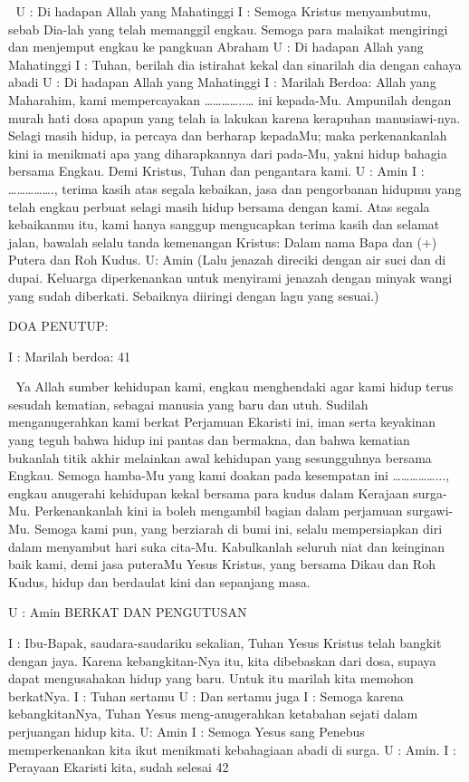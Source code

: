 \documentclass[10pt,a5paper,fancyhdr]{memoir}
\begin{document}

U : Di hadapan Allah yang Mahatinggi 
I : Semoga Kristus menyambutmu, sebab Dia-lah yang telah 
memanggil engkau. Semoga para malaikat mengiringi dan 
menjemput engkau ke pangkuan Abraham 
U : Di hadapan Allah yang Mahatinggi 
I : Tuhan, berilah dia istirahat kekal dan sinarilah dia dengan cahaya 
abadi 
U : Di hadapan Allah yang Mahatinggi 
I : Marilah Berdoa: 
Allah yang Maharahim, kami mempercayakan …………..… ini 
kepada-Mu. Ampunilah dengan murah hati dosa apapun yang telah ia 
lakukan karena kerapuhan manusiawi-nya. Selagi masih hidup, ia 
percaya dan berharap kepadaMu; maka perkenankanlah kini ia 
menikmati apa yang diharapkannya dari pada-Mu, yakni hidup 
bahagia bersama Engkau. Demi Kristus, Tuhan dan pengantara kami. 
U : Amin 
I : ……………., terima kasih atas segala kebaikan, jasa dan 
pengorbanan hidupmu yang telah engkau perbuat selagi masih hidup 
bersama dengan kami. Atas segala kebaikanmu itu, kami hanya 
sanggup mengucapkan terima kasih dan selamat jalan, bawalah selalu 
tanda kemenangan Kristus: Dalam nama Bapa dan (+) Putera dan 
Roh Kudus. 
U: Amin 
(Lalu jenazah direciki dengan air suci dan di dupai. Keluarga 
diperkenankan untuk menyirami jenazah dengan minyak wangi yang 
sudah diberkati. Sebaiknya diiringi dengan lagu yang sesuai.) 

DOA PENUTUP: 

I : Marilah berdoa: 
41 



Ya Allah sumber kehidupan kami, engkau menghendaki agar kami 
hidup terus sesudah kematian, sebagai manusia yang baru dan utuh. 
Sudilah menganugerahkan kami berkat Perjamuan Ekaristi ini, iman 
serta keyakinan yang teguh bahwa hidup ini pantas dan bermakna, 
dan bahwa kematian bukanlah titik akhir melainkan awal kehidupan 
yang sesungguhnya bersama Engkau. Semoga hamba-Mu yang kami 
doakan pada kesempatan ini ……………..., engkau anugerahi 
kehidupan kekal bersama para kudus dalam Kerajaan surga-Mu. 
Perkenankanlah kini ia boleh mengambil bagian dalam perjamuan 
surgawi-Mu. Semoga kami pun, yang berziarah di bumi ini, selalu 
mempersiapkan diri dalam menyambut hari suka cita-Mu. 
Kabulkanlah seluruh niat dan keinginan baik kami, demi jasa 
puteraMu Yesus Kristus, yang bersama Dikau dan Roh Kudus, hidup 
dan berdaulat kini dan sepanjang masa. 

U : Amin 
BERKAT DAN PENGUTUSAN 

I : Ibu-Bapak, saudara-saudariku sekalian, Tuhan Yesus Kristus telah 
bangkit dengan jaya. Karena kebangkitan-Nya itu, kita dibebaskan 
dari dosa, supaya dapat mengusahakan hidup yang baru. Untuk itu 
marilah kita memohon berkatNya. 
I : Tuhan sertamu 
U : Dan sertamu juga 
I : Semoga karena kebangkitanNya, Tuhan Yesus meng-anugerahkan 
ketabahan sejati dalam perjuangan hidup kita. 
U: Amin 
I : Semoga Yesus sang Penebus memperkenankan kita ikut 
menikmati kebahagiaan abadi di surga. 
U : Amin. 
I : Perayaan Ekaristi kita, sudah selesai 
42 
\end{document}

